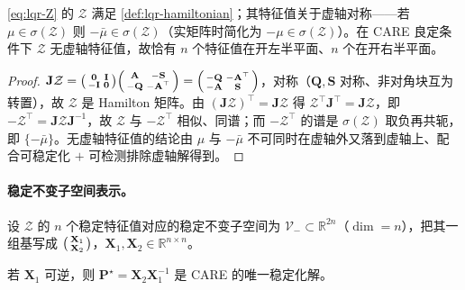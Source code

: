 \begin{proposition}\label{prop:lqr-symplectic}
\cref{eq:lqr-Z} 的 $\mathcal Z$ 满足 \cref{def:lqr-hamiltonian}；其特征值关于虚轴对称——若 $\mu\in\sigma(\mathcal Z)$ 则 $-\bar\mu\in\sigma(\mathcal Z)$（实矩阵时简化为 $-\mu\in\sigma(\mathcal Z)$）。在 CARE 良定条件下 $\mathcal Z$ 无虚轴特征值，故恰有 $n$ 个特征值在开左半平面、$n$ 个在开右半平面。
\end{proposition}

\begin{proof}
$\mathbf J\mathcal Z=\begin{psmallmatrix}\mathbf0&\mathbf I\\-\mathbf I&\mathbf0\end{psmallmatrix}\begin{psmallmatrix}\mathbf A&-\mathbf S\\-\mathbf Q&-\mathbf A^\top\end{psmallmatrix}=\begin{psmallmatrix}-\mathbf Q&-\mathbf A^\top\\-\mathbf A&\mathbf S\end{psmallmatrix}$，对称（$\mathbf Q,\mathbf S$ 对称、非对角块互为转置），故 $\mathcal Z$ 是 Hamilton 矩阵。由 $(\mathbf J\mathcal Z)^\top=\mathbf J\mathcal Z$ 得 $\mathcal Z^\top\mathbf J^\top=\mathbf J\mathcal Z$，即 $-\mathcal Z^\top=\mathbf J\mathcal Z\mathbf J^{-1}$，故 $\mathcal Z$ 与 $-\mathcal Z^\top$ 相似、同谱；而 $-\mathcal Z^\top$ 的谱是 $\sigma(\mathcal Z)$ 取负再共轭，即 $\{-\bar\mu\}$。无虚轴特征值的结论由 $\mu$ 与 $-\bar\mu$ 不可同时在虚轴外又落到虚轴上、配合可稳定化 $+$ 可检测排除虚轴解得到。
\end{proof}

\paragraph{稳定不变子空间表示。}
设 $\mathcal Z$ 的 $n$ 个稳定特征值对应的稳定不变子空间为 $\mathcal V_-\subset\mathbb R^{2n}$（$\dim=n$），把其一组基写成 $\begin{psmallmatrix}\mathbf X_1\\\mathbf X_2\end{psmallmatrix}$，$\mathbf X_1,\mathbf X_2\in\mathbb R^{n\times n}$。

\begin{theorem}\label{thm:lqr-invsubspace}
若 $\mathbf X_1$ 可逆，则 $\mathbf P^\star=\mathbf X_2\mathbf X_1^{-1}$ 是 CARE 的唯一稳定化解。
\end{theorem}

